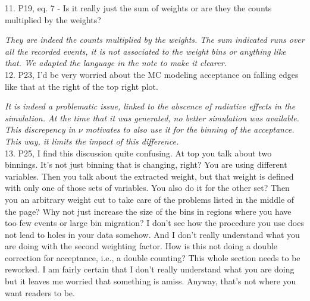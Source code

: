 \documentclass[12pt]{article}
\begin{document}
11.
P19, eq. 7 - Is it really just the sum of weights or are they the counts multiplied by the 
weights?

{\it They are indeed the counts multiplied by the weights.
The sum indicated runs over all the recorded events, it is not associated to the weight
bins or anything like that. We adapted the language in the note to make it clearer.} \\


12.
P23, I’d be very worried about the MC modeling acceptance on falling edges like that at the 
right of the top right plot.

{\it It is indeed a problematic issue, linked to the abscence of radiative effects in the 
simulation. At the time that it was generated, no better simulation was available. This
discrepency in $\nu$ motivates to also use it for the binning of the acceptance. This way,
it limits the impact of this difference.} \\


13.
P25, I find this discussion quite confusing.   At top you talk about two binnings.  It’s not just 
binning that is changing, right?  You are using different variables.  Then you talk about the 
extracted weight, but that weight is defined with only one of those sets of variables.  You 
also do it for the other set?  Then you an arbitrary weight cut to take care of the problems 
listed in the middle of the page?  Why not just increase the size of the bins in regions where 
you have too few events or large bin migration?  I don’t see how the procedure you use 
does not lead to holes in your data somehow.  And I don’t really understand what you are 
doing with the second weighting factor.  How is this not doing a double correction for 
acceptance, i.e., a double counting?  This whole section needs to be reworked.  I am fairly 
certain that I don’t really understand what you are doing but it leaves me worried that 
something is amiss.  Anyway, that’s not where you want readers to be.  
\end{document}
